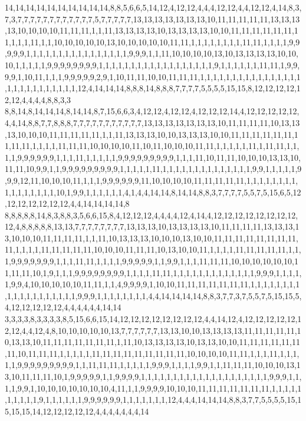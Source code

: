 14,14,14,14,14,14,14,14,14,14,8,8,5,6,6,5,14,12,4,12,12,4,4,4,12,12,4,4,12,12,4,14,8,3,7,3,7,7,7,7,7,7,7,7,7,7,7,7,5,7,7,7,7,7,13,13,13,13,13,13,13,10,11,11,11,11,11,13,13,13,13,10,10,10,10,11,11,11,1,1,11,13,13,13,13,10,13,13,13,13,10,10,11,11,11,11,11,11,11,1,1,1,11,1,1,10,10,10,10,10,13,10,10,10,10,10,11,11,1,1,1,1,1,1,1,1,11,11,1,1,1,1,9,9,9,9,9,1,1,1,1,1,1,1,1,1,1,1,1,1,1,1,1,9,9,9,1,1,11,10,10,10,10,13,10,13,13,13,13,10,10,10,1,1,1,1,1,9,9,9,9,9,9,9,9,1,1,1,1,1,1,1,1,1,1,1,1,1,1,1,1,1,1,9,1,1,1,1,1,1,11,11,1,9,9,9,9,1,10,11,1,1,1,9,9,9,9,9,2,9,1,10,11,11,10,10,11,11,11,1,1,1,1,1,1,1,1,1,1,1,1,1,1,1,1,1,1,1,1,1,1,1,1,1,1,1,12,4,14,14,14,8,8,8,14,8,8,8,7,7,7,7,5,5,5,5,15,15,8,12,12,12,12,12,12,4,4,4,4,8,8,3,3
8,8,14,8,14,14,14,8,14,14,8,7,15,6,6,3,4,12,12,4,12,12,4,12,12,12,14,4,12,12,12,12,12,4,4,14,8,8,7,7,8,8,8,7,7,7,7,7,7,7,7,7,7,7,13,13,13,13,13,13,13,10,11,11,11,11,10,13,13,13,10,10,10,11,11,11,11,11,1,1,11,13,13,13,10,10,13,13,13,10,10,11,11,11,11,11,11,11,11,11,1,1,1,1,11,11,11,10,10,10,10,11,10,11,10,10,10,11,11,1,1,1,1,1,11,1,11,11,1,1,1,1,9,9,9,9,9,9,1,1,1,11,1,1,1,1,1,9,9,9,9,9,9,9,9,9,1,1,1,11,10,11,11,10,10,10,13,13,10,11,11,10,9,9,1,1,9,9,9,9,9,9,9,9,9,1,1,1,1,1,11,1,1,1,1,1,1,1,1,1,1,1,1,1,1,9,9,1,1,1,1,1,9,9,9,12,11,10,10,10,11,1,1,1,9,9,9,9,9,9,11,10,10,10,10,11,11,11,11,11,1,1,1,1,1,1,1,1,1,1,1,1,1,1,1,1,10,1,9,9,1,1,1,1,1,1,4,1,4,4,14,14,8,14,14,8,8,3,7,7,7,7,5,5,7,5,15,6,5,12,12,12,12,12,12,12,4,4,14,14,14,14,8
8,8,8,8,8,14,8,3,8,8,3,5,6,6,15,8,4,12,12,12,4,4,4,4,12,4,14,4,12,12,12,12,12,12,12,12,12,4,8,8,8,8,8,13,13,7,7,7,7,7,7,7,7,13,13,13,10,13,13,13,13,10,11,11,11,11,13,13,13,13,10,10,10,11,11,11,11,1,1,11,10,13,13,13,10,10,10,13,10,10,11,11,11,11,11,11,11,11,11,1,1,1,1,11,11,11,11,11,10,10,10,11,11,11,10,13,10,10,11,1,1,1,1,11,11,11,11,11,1,1,1,9,9,9,9,9,9,9,1,1,1,11,11,1,1,1,1,9,9,9,9,9,1,1,9,9,1,1,1,11,11,11,10,10,10,10,10,10,11,11,11,10,1,9,1,1,1,9,9,9,9,9,9,9,9,1,1,1,1,11,11,1,1,1,1,1,1,1,1,1,1,1,1,1,9,9,9,1,1,1,1,1,9,9,4,10,10,10,10,10,11,11,1,1,4,9,9,9,9,1,10,10,11,11,11,11,11,11,11,1,1,1,1,1,1,1,1,1,1,1,1,1,1,1,1,1,1,1,9,9,9,1,1,1,1,1,1,1,1,4,4,14,14,14,14,8,8,3,7,7,3,7,5,5,7,5,15,15,5,4,12,12,12,12,12,4,4,4,4,4,4,14,14
3,3,3,3,8,3,3,3,3,8,5,15,6,6,15,14,12,12,12,12,12,12,12,12,4,4,14,12,4,12,12,12,12,12,12,12,4,4,12,4,8,10,10,10,10,10,13,7,7,7,7,7,7,13,13,10,10,13,13,13,13,11,11,11,11,11,10,13,13,10,11,11,11,11,11,11,11,1,11,10,13,13,13,13,10,13,13,10,10,11,11,11,11,11,11,11,10,11,11,11,1,1,1,1,1,11,11,11,11,11,11,11,11,11,10,10,10,10,11,11,1,1,1,11,1,1,1,1,1,9,9,9,9,9,9,9,9,9,1,1,11,11,11,1,1,1,1,1,9,9,9,1,1,1,1,9,9,1,1,11,11,11,10,10,10,13,13,10,11,11,11,10,1,9,9,9,9,9,1,1,9,9,9,9,1,1,1,1,1,1,1,1,1,1,1,1,1,1,1,1,1,1,1,1,9,9,9,1,1,1,1,9,9,1,10,10,10,10,10,10,10,4,11,1,1,9,9,9,9,10,10,10,11,11,11,11,11,11,11,1,1,1,1,1,1,1,1,1,1,9,1,1,1,1,1,1,9,9,9,9,9,9,1,1,1,1,1,1,1,12,4,4,4,14,14,14,8,8,3,7,7,5,5,5,5,15,15,15,15,14,12,12,12,12,12,4,4,4,4,4,4,4,14
